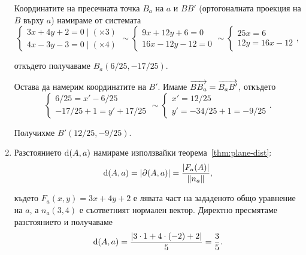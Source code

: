 \documentclass[numbers=endperiod, DIV=15]{scrartcl}
\begin{document}
\begin{solution}
\begin{enumerate}[label=\alph*)]
    Координатите на пресечната точка $B_a$ на $a$ и $BB'$ (ортогоналната проекция на $B$ върху $a$) намираме от системата
    \begin{displaymath}
      \begin{cases}
        3x + 4y + 2 = 0 \mid (\times 3) \\
        4x - 3y - 3 = 0 \mid (\times 4)
      \end{cases}
      \sim
      \begin{cases}
        9x + 12y + 6 = 0 \\
        16x - 12y - 12 = 0
      \end{cases}
      \sim
      \begin{cases}
        25x = 6 \\
        12y = 16x - 12
      \end{cases},
    \end{displaymath}

    откъдето получаваме $B_a(6/25, -17/25)$.

    Остава да намерим координатите на $B'$. Имаме $\overrightarrow{BB_a} = \overrightarrow{B_a B'}$, откъдето
    \begin{displaymath}
      \begin{cases}
        6/25 = x' - 6/25 \\
        -17/25 + 1 = y' + 17/25
      \end{cases}
      \sim
      \begin{cases}
        x' = 12/25 \\
        y' = -34/25 + 1 = -9/25
      \end{cases}.
    \end{displaymath}

    Получихме $B'(12/25, -9/25)$.

    \item Разстоянието $\operatorname{d}(A, a)$ намираме използвайки теорема~\ref{thm:plane-dist}:
    \begin{displaymath}
      \operatorname{d}(A, a) = \left\vert \partial(A, a) \right\vert = \frac {\left\vert F_a(A) \right\vert} {\left\Vert n_a \right\Vert},
    \end{displaymath}

    където $F_a(x, y) = 3x + 4y + 2$ е лявата част на зададеното общо уравнение на $a$, а $n_a(3, 4)$ е съответният нормален вектор. Директно пресмятаме разстоянието и получаваме
    \begin{displaymath}
      \operatorname{d}(A, a) = \frac {\left\vert 3 \cdot 1 + 4 \cdot (-2) + 2 \right\vert} 5 = \frac 3 5.
    \end{displaymath}


\end{enumerate}
\end{solution}
\end{document}
